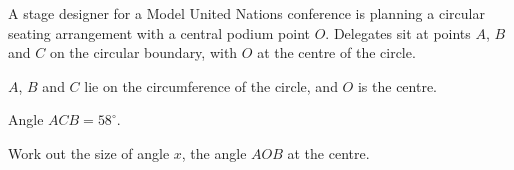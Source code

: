 \begin{question}
\noindent A stage designer for a Model United Nations conference is planning a circular seating arrangement with a central podium point $O$. Delegates sit at points $A$, $B$ and $C$ on the circular boundary, with $O$ at the centre of the circle.

\begin{center}
\end{center}

\noindent $A$, $B$ and $C$ lie on the circumference of the circle, and $O$ is the centre.

Angle $ACB = 58^\circ$.

Work out the size of angle $x$, the angle $AOB$ at the centre.

\vspace{4cm}

\begin{flushright}
\end{flushright}
\end{question}
